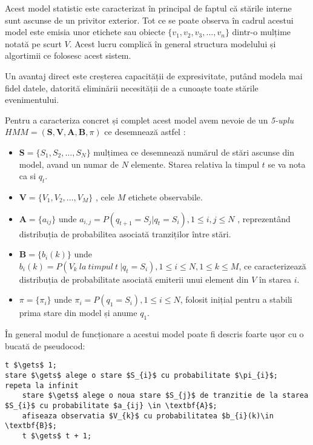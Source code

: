 Acest model statistic este caracterizat în principal de faptul că stările interne sunt ascunse de un privitor exterior. Tot ce se poate observa în cadrul acestui model este emisia unor etichete sau obiecte 
$\{v_{1},v_{2},v_{3},\dots,v_{n}\}$ dintr-o mulțime notată pe scurt $V$. Acest lucru complică în general structura modelului și algortimii ce folosesc acest sistem. \par

Un avantaj direct este creșterea capacității de expresivitate, putând modela mai fidel datele, datorită eliminării necesității de a cunoaște toate stările evenimentului.\par

Pentru a caracteriza concret și complet acest model avem nevoie de un \textit{5-uplu} $ HMM = (\textbf{S},\textbf{V},\textbf{A},\textbf{B},\pi)$ ce desemnează astfel : \par
\begin{itemize}
\item{$\textbf{S} = \{S_{1},S_{2},\dots,S_{N}\}$ mulțimea ce desemnează numărul de stări ascunse din model, avand un numar de $N$ elemente. Starea relativa la timpul $t$ se va nota ca si $q_{t}$.}
\item{$\textbf{V} = \{V_{1},V_{2},\dots,V_{M}\}$ , cele $M$ etichete observabile.}
\item{$\textbf{A} = \{a_{ij}\}$ unde $a_{i,j} = P(q_{t+1} = S_{j} | q_{t} = S_{i}) , 1 \leq i , j \leq N$ , reprezentând distribuția de probabilitea asociată tranziților între stări.}
\item{$\textbf{B} = \{b_{i}(k)\}$ unde $b_{i}(k) = P(V_{k}\ la\ timpul\ t\ | q_{t} = S_{i}), 1 \leq i \leq N , 1 \leq k \leq M$, ce caracterizează distribuția de probabilitate asociată emiterii unui element din $V$ în starea $i$.}
\item{$\pi = \{\pi_{i}\}$ unde $\pi_{i} = P(q_{1} = S_{i}) , 1 \leq i \leq N$, folosit inițial pentru a stabili prima stare din model și anume $q_{1}$.}
\end{itemize}
\par

În general modul de funcționare a acestui model poate fi descris foarte ușor cu o bucată de pseudocod:

\begin{lstlisting}[mathescape=true]
t $\gets$ 1;
stare $\gets$ alege o stare $S_{i}$ cu probabilitate $\pi_{i}$;
repeta la infinit
	stare $\gets$ alege o noua stare $S_{j}$ de tranzitie de la starea $S_{i}$ cu probabilitate $a_{ij} \in \textbf{A}$;
	afiseaza observatia $V_{k}$ cu probabilitatea $b_{i}(k)\in \textbf{B}$;
	t $\gets$ t + 1;
\end{lstlisting}

